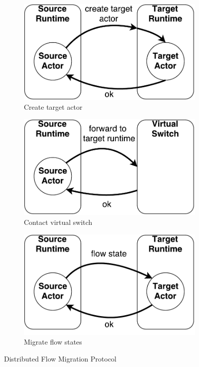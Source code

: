 \begin{figure}[!t]
	\begin{subfigure}[t]{0.30\linewidth}
		\centering
		\includegraphics[width=\columnwidth]{figure/NFActor-Flow-Migration-First.pdf}
		\caption{Create target actor}\label{fig:first} \end{subfigure}\hfill
	\begin{subfigure}[t]{0.30\linewidth}
		\centering
		\includegraphics[width=\columnwidth]{figure/NFActor-Flow-Migration-Second.pdf}
		\caption{Contact virtual switch}\label{fig:second}
	 \end{subfigure}\hfill
	 \begin{subfigure}[t]{0.30\linewidth}
		\centering
		\includegraphics[width=\columnwidth]{figure/NFActor-Flow-Migration-Third.pdf}
		\caption{Migrate flow states}\label{fig:third}
	 \end{subfigure}
\caption{Distributed Flow Migration Protocol}
\label{fig:migration}
\end{figure}

